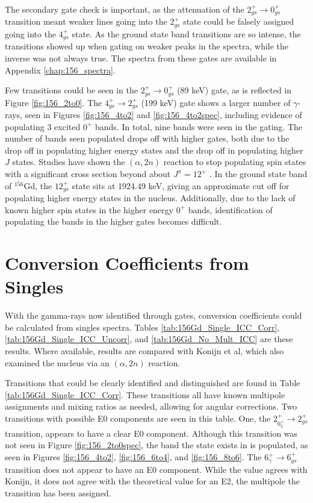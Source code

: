 

The secondary gate check is important, as the attenuation of the $2_{gs}^+\rightarrow0_{gs}^+$ transition meant weaker lines going into the $2_{gs}^+$ state could be falsely assigned going into the $4_{gs}^+$ state. As the ground state band transitions are so intense, the transitions showed up when gating on weaker peaks in the spectra, while the inverse was not always true. The spectra from these gates are available in Appendix \ref{chap:156_spectra}.

Few transitions could be seen in the $2_{gs}^+\rightarrow0_{gs}^+$ (89 keV) gate, as is reflected in Figure \ref{fig:156_2to0}. The $4_{gs}^+\rightarrow2_{gs}^+$ (199 keV) gate shows a larger number of $\gamma$-rays, seen in Figures \ref{fig:156_4to2} and \ref{fig:156_4to2spec}, including evidence of populating 3 excited $0^+$ bands. In total, nine bands were seen in the gating. The number of bands seen populated drops off with higher gates, both due to the drop off in populating higher energy states and the drop off in populating higher $J$ states. Studies have shown the $(\alpha,2n)$ reaction to stop populating spin states with a significant cross section beyond about $J^{\pi}=12^+$ \citep{wu93:_a2n}. In the ground state band of $^{156}$Gd, the $12^+_{gs}$ state sits at 1924.49 keV, giving an approximate cut off for populating higher energy states in the nucleus. Additionally, due to the lack of known higher spin states in the higher energy $0^+$ bands, identification of populating the bands in the higher gates becomes difficult.

\section{Conversion Coefficients from Singles}

With the gamma-rays now identified through gates, conversion coefficients could be calculated from singles spectra. Tables \ref{tab:156Gd_Single_ICC_Corr}, \ref{tab:156Gd_Single_ICC_Uncorr}, and \ref{tab:156Gd_No_Mult_ICC} are these results. Where available, results are compared with Konijn et al\citep{konijn81:_156gd}, which also examined the nucleus via an $(\alpha,2n)$ reaction.

Transitions that could be clearly identified and distinguished are found in Table \ref{tab:156Gd_Single_ICC_Corr}. These transitions all have known multipole assignments and mixing ratios as needed, allowing for angular corrections. Two transitions with possible E0 components are seen in this table. One, the $2^+_{0^+_{2}}\rightarrow 2^+_{gs}$ transition, appears to have a clear E0 component. Although this transition was not seen in Figure \ref{fig:156_2to0spec}, the band the state exists in is populated, as seen in Figures \ref{fig:156_4to2}, \ref{fig:156_6to4}, and \ref{fig:156_8to6}. The $6^+_{\gamma}\rightarrow 6^+_{gs}$ transition does not appear to have an E0 component. While the value agrees with Konijn\citep{konijn81:_156gd}, it does not agree with the theoretical value for an E2, the multipole the transition has been assigned.

